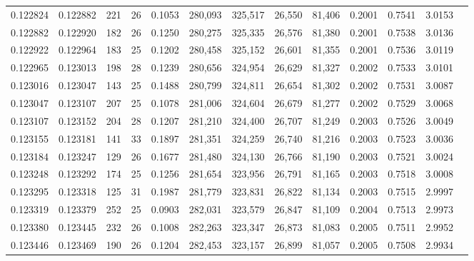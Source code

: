 \begin{tabular}{rrrrrrrrrrrrr}
0.122824 & 0.122882 & 221 &  26 &                                     0.1053 & 280,093 & 325,517 &  26,550 &  81,406 & 0.2001 & 0.7541 & 3.0153 \\
0.122882 & 0.122920 & 182 &  26 &                                     0.1250 & 280,275 & 325,335 &  26,576 &  81,380 & 0.2001 & 0.7538 & 3.0136 \\
0.122922 & 0.122964 & 183 &  25 &                                     0.1202 & 280,458 & 325,152 &  26,601 &  81,355 & 0.2001 & 0.7536 & 3.0119 \\
0.122965 & 0.123013 & 198 &  28 &                                     0.1239 & 280,656 & 324,954 &  26,629 &  81,327 & 0.2002 & 0.7533 & 3.0101 \\
0.123016 & 0.123047 & 143 &  25 &                                     0.1488 & 280,799 & 324,811 &  26,654 &  81,302 & 0.2002 & 0.7531 & 3.0087 \\
0.123047 & 0.123107 & 207 &  25 &                                     0.1078 & 281,006 & 324,604 &  26,679 &  81,277 & 0.2002 & 0.7529 & 3.0068 \\
0.123107 & 0.123152 & 204 &  28 &                                     0.1207 & 281,210 & 324,400 &  26,707 &  81,249 & 0.2003 & 0.7526 & 3.0049 \\
0.123155 & 0.123181 & 141 &  33 &                                     0.1897 & 281,351 & 324,259 &  26,740 &  81,216 & 0.2003 & 0.7523 & 3.0036 \\
0.123184 & 0.123247 & 129 &  26 &                                     0.1677 & 281,480 & 324,130 &  26,766 &  81,190 & 0.2003 & 0.7521 & 3.0024 \\
0.123248 & 0.123292 & 174 &  25 &                                     0.1256 & 281,654 & 323,956 &  26,791 &  81,165 & 0.2003 & 0.7518 & 3.0008 \\
0.123295 & 0.123318 & 125 &  31 &                                     0.1987 & 281,779 & 323,831 &  26,822 &  81,134 & 0.2003 & 0.7515 & 2.9997 \\
0.123319 & 0.123379 & 252 &  25 &                                     0.0903 & 282,031 & 323,579 &  26,847 &  81,109 & 0.2004 & 0.7513 & 2.9973 \\
0.123380 & 0.123445 & 232 &  26 &                                     0.1008 & 282,263 & 323,347 &  26,873 &  81,083 & 0.2005 & 0.7511 & 2.9952 \\
0.123446 & 0.123469 & 190 &  26 &                                     0.1204 & 282,453 & 323,157 &  26,899 &  81,057 & 0.2005 & 0.7508 & 2.9934 \\

\end{tabular}
